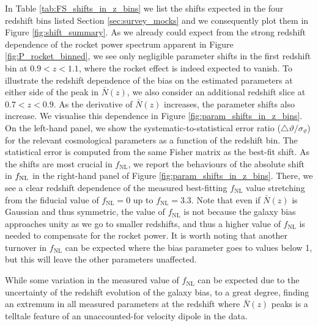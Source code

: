 \documentclass[a4paper,11pt]{article}
\begin{document}
In Table \ref{tab:FS_shifts_in_z_bins} we list the shifts expected in the four redshift bins listed Section \ref{sec:survey_mocks} and we consequently plot them in Figure \ref{fig:shift_summary}. As we already could expect from the strong redshift dependence of the rocket power spectrum apparent in Figure \ref{fig:P_rocket_binned}, we see only negligible parameter shifts in the first redshift bin at $0.9 < z < 1.1$, where the rocket effect is indeed expected to vanish. To illustrate the redshift dependence of the bias on the estimated parameters at either side of the peak in $\bar N(z)$,  we also consider an additional redshift slice at $0.7 < z < 0.9$. 
  As the derivative of $\bar N(z)$ increases, the parameter shifts also increase. We visualise this dependence in Figure \ref{fig:param_shifts_in_z_bins}. 
  On the left-hand panel, we show the systematic-to-statistical error ratio ($\triangle\vartheta/\sigma_\vartheta$) for the relevant cosmological parameters as a function of the redshift bin. The statistical error is computed from the same Fisher matrix as the best-fit shift. As the shifts are most crucial in $f_\mathrm{NL}$, we report the behaviours of the absolute shift in $f_{\rm NL}$ in the right-hand panel of Figure \ref{fig:param_shifts_in_z_bins}. There, we see a clear redshift dependence of the measured best-fitting $f_\mathrm{NL}$ value stretching from the fiducial value of $f_\mathrm{NL} = 0$ up to $f_\mathrm{NL} = 3.3$. Note that even if $\bar N(z)$ is Gaussian and thus symmetric, the value of $f_\mathrm{NL}$ is not because the galaxy bias approaches unity as we go to smaller redshifts, and thus a higher value of $f_\mathrm{NL}$ is needed to compensate for the rocket power. It is worth noting that another turnover in $f_\mathrm{NL}$ can be expected where the bias parameter goes to values below 1, but this will leave the other parameters unaffected. 

While some variation in the measured value of $f_\mathrm{NL}$ can be expected due to the uncertainty of the redshift evolution of the galaxy bias, to a great degree, finding an extremum in all measured parameters at the redshift where $\bar N(z)$ peaks is a telltale feature of an unaccounted-for velocity dipole in the data.
\end{document}
